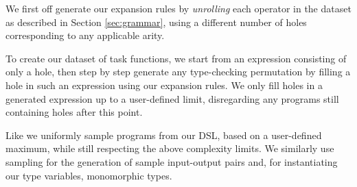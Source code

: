 \documentclass{article}
\begin{document}

We first off generate our expansion rules by \emph{unrolling} each operator in the dataset
as described in Section \ref{sec:grammar},
using a different number of holes corresponding to any applicable arity.


To create our dataset of task functions,
we start from an expression consisting of only a hole,
then step by step generate any type-checking permutation
by filling a hole in such an expression using our expansion rules.
We only fill holes in a generated expression up to a 
user-defined limit,
disregarding any programs still containing holes after this point.

Like \citet{nsps} we uniformly sample programs from our DSL,
based on a 
user-defined maximum,
while still respecting the above complexity limits.
We similarly use sampling for the generation of sample input-output pairs and,
for instantiating our type variables, monomorphic types.
\end{document}
